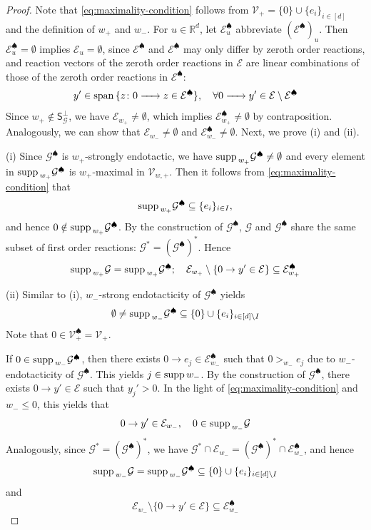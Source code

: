 \documentclass[10pt]{amsart}
\numberwithin{equation}{section}
\theoremstyle{plain}
\theoremstyle{definition}
\theoremstyle{remark}
\newcommand{\cE}{\mathcal{E}}
\newcommand{\cG}{\mathcal{G}}
\newcommand{\cI}{I}
\newcommand{\cV}{\mathcal{V}}
\newcommand{\supp}{{\rm supp\,}}
\newcommand{\spa}{{\rm span\,}}
\begin{document}
\begin{proof}
Note that \eqref{eq:maximality-condition} follows from $\cV_+=\{0\}\cup\{e_i\}_{i\in[d]}$ and the definition of $w_+$ and $w_-$. For $u\in\mathbb{R}^d$, let $\cE^{\spadesuit}_u$ abbreviate $(\cE^{\spadesuit})_u$.
Then $\cE^{\spadesuit}_u=\emptyset$ implies $\cE_u=\emptyset$, since $\cE^{\spadesuit}$ and $\cE^{\spadesuit}$ may only differ by zeroth order reactions, and reaction vectors of the zeroth order reactions in $\cE$ are linear combinations of those of the zeroth order reactions in $\cE^{\spadesuit}$:
\begin{equation}\label{eq:linear-dependence}
y'\in\spa\{z\colon 0\ce{->}z\in \cE^{\spadesuit}\},\quad \forall 0\ce{->}y'\in\cE\setminus \cE^{\spadesuit}
\end{equation} Since $w_+\notin\mathsf{S}_{\cG}^{\perp}$, we have $\cE_{w_+}\neq\emptyset$, which implies $\cE^{\spadesuit}_{w_+}\neq\emptyset$ by contraposition. Analogously, we can show that $\cE_{w_-}\neq\emptyset$ and $\cE^{\spadesuit}_{w_-}\neq\emptyset$. Next, we prove (i) and (ii).
\medskip

\noindent (i) Since $\cG^{\spadesuit}$ is $w_+$-strongly endotactic,  we have $\supp_{w_+}\cG^{\spadesuit}\neq\emptyset$ and every element in $\supp_{w_+}\cG^{\spadesuit}$ is $w_+$-maximal  in $\cV_{w,+}$. Then it follows from  \eqref{eq:maximality-condition} that $$\supp_{w_+}\cG^{\spadesuit}\subseteq\{e_i\}_{i\in\cI},$$ and hence $0\notin\supp_{w_+}\cG^{\spadesuit}$. By the  construction of $\cG^{\spadesuit}$,  $\cG$ and $\cG^{\spadesuit}$ share the same subset of first order reactions: $\cG^*=(\cG^{\spadesuit})^*$. Hence $$\supp_{w_+}\cG=\supp_{w_+}\cG^{\spadesuit};\quad \cE_{w_+}\setminus\{0\to y'\in\cE\}\subseteq \cE^{\spadesuit}_{w_+}$$
\medskip

\noindent(ii) Similar to (i),  $w_-$-strong endotacticity  of $\cG^{\spadesuit}$ yields $$\emptyset\neq\supp_{w_-}\cG^{\spadesuit}\subseteq\{0\}\cup\{e_i\}_{i\in[d]\setminus\cI}$$ Note that $0\in \cV^{\spadesuit}_+=\cV_+$.

If $0\in\supp_{w_-}\cG^{\spadesuit}$, then there exists $0\to e_j\in \cE^{\spadesuit}_{w_-}$ such that $0>_{w_-}e_j$ due to $w_-$-endotacticity of $\cG^{\spadesuit}$. This yields $j\in\supp w_-$. By the construction of $\cG^{\spadesuit}$, there exists $0\to y'\in\cE$ such that $y_j'>0$. In the light of \eqref{eq:maximality-condition} and $w_-\le0$, this yields that $$0\to y'\in\cE_{w_-},\quad 0\in\supp_{w_-}\cG$$ Analogously, since $\cG^*=(\cG^{\spadesuit})^*$, we have $\cG^*\cap\cE_{w_-}=(\cG^{\spadesuit})^*\cap \cE^{\spadesuit}_{w_-}$, and hence \[\supp_{w_-}\cG=\supp_{w_-}\cG^{\spadesuit}\subseteq\{0\}\cup\{e_i\}_{i\in[d]\setminus\cI}\]
and \begin{equation}\label{eq:essential-reactions}
\cE_{w_-}\setminus\{0\to y'\in\cE\}\subseteq \cE^{\spadesuit}_{w_-}
\end{equation}


\end{proof}
\end{document}
